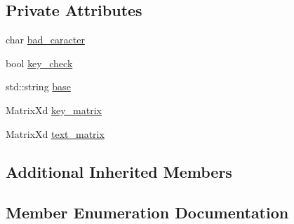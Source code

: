 \subsection*{Private Attributes}
\begin{DoxyCompactItemize}
\item 
char \hyperlink{class__102_ace05d98669089dc84365b756a7555d08}{bad\+\_\+caracter}
\item 
bool \hyperlink{class__102_aedece1a24c9d0ba12efa5e9429eb2de0}{key\+\_\+check}
\item 
std\+::string \hyperlink{class__102_aa3c33241b01dba968530f960bdb21fc3}{base}
\item 
Matrix\+Xd \hyperlink{class__102_a6284519dfd2d04e52a37e265488d05cc}{key\+\_\+matrix}
\item 
Matrix\+Xd \hyperlink{class__102_a2836a7b0f462c1f3ff8b6df7e41420f2}{text\+\_\+matrix}
\end{DoxyCompactItemize}
\subsection*{Additional Inherited Members}


\subsection{Member Enumeration Documentation}
\hypertarget{class__102_a4d2a75091d5c3bedfba6c129a8ed49f1}{}
